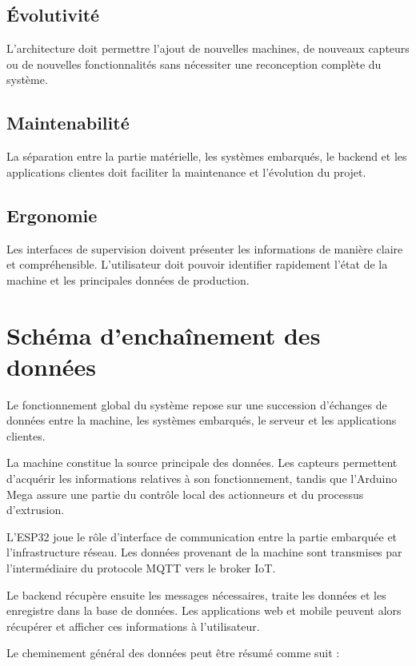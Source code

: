 \subsection{Évolutivité}

L'architecture doit permettre l'ajout de nouvelles machines, de nouveaux
capteurs ou de nouvelles fonctionnalités sans nécessiter une
reconception complète du système.

\subsection{Maintenabilité}

La séparation entre la partie matérielle, les systèmes embarqués, le
backend et les applications clientes doit faciliter la maintenance et
l'évolution du projet.

\subsection{Ergonomie}

Les interfaces de supervision doivent présenter les informations de
manière claire et compréhensible. L'utilisateur doit pouvoir identifier
rapidement l'état de la machine et les principales données de production.

\section{Schéma d'enchaînement des données}

Le fonctionnement global du système repose sur une succession d'échanges
de données entre la machine, les systèmes embarqués, le serveur et les
applications clientes.

La machine constitue la source principale des données. Les capteurs
permettent d'acquérir les informations relatives à son fonctionnement,
tandis que l'Arduino Mega assure une partie du contrôle local des
actionneurs et du processus d'extrusion.

L'ESP32 joue le rôle d'interface de communication entre la partie
embarquée et l'infrastructure réseau. Les données provenant de la machine
sont transmises par l'intermédiaire du protocole MQTT vers le broker IoT.

Le backend récupère ensuite les messages nécessaires, traite les données
et les enregistre dans la base de données. Les applications web et mobile
peuvent alors récupérer et afficher ces informations à l'utilisateur.

Le cheminement général des données peut être résumé comme suit :

